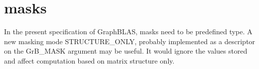 \section{masks}
\label{Sec:Masks}

 In the present specification of GraphBLAS, masks need to be predefined
 type. A new masking mode {\sf STRUCTURE\_ONLY}, probably implemented as a
 descriptor on the {\sf GrB\_MASK} argument may be useful. It would ignore
 the values stored and affect computation based on matrix structure only.
 
